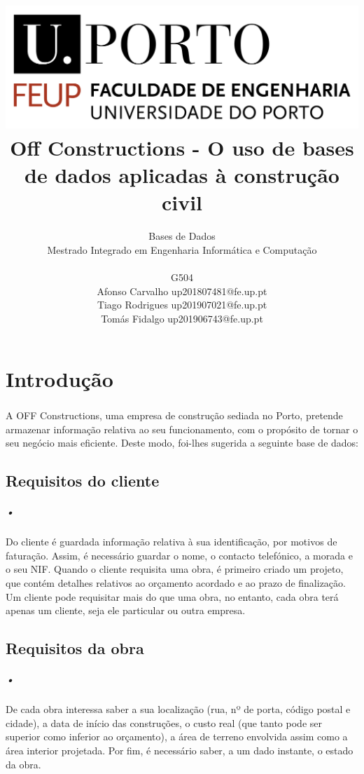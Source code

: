 \documentclass{report}
\title{ \includegraphics[scale=0.3]{logo.png} \\ \textbf{Off Constructions - O uso de bases de dados aplicadas à construção civil}}
\author{Bases de Dados \\ Mestrado Integrado em Engenharia Informática e Computação \\ \\ G504 \\ Afonso Carvalho up201807481@fe.up.pt \\ Tiago Rodrigues up201907021@fe.up.pt \\ Tomás Fidalgo up201906743@fe.up.pt}
\begin{document}
	\maketitle
	
	\tableofcontents
	
	\chapter{Introdução}
		\paragraph{}A OFF Constructions, uma empresa de construção sediada no Porto, pretende
		armazenar informação relativa ao seu funcionamento, com o propósito de tornar o seu
		negócio mais eficiente. Deste modo, foi-lhes sugerida a seguinte base de dados:
		
		\section{Requisitos do cliente}
		
			\paragraph{•}Do cliente é guardada informação relativa à sua identificação, por
			motivos de faturação. Assim, é necessário guardar o nome, o contacto telefónico, a
			morada e o seu NIF. Quando o cliente requisita uma obra, é primeiro criado um
			projeto, que contém detalhes relativos ao orçamento acordado e ao prazo de
			finalização. Um cliente pode requisitar mais do que uma obra, no entanto, cada
			obra terá apenas um cliente, seja ele particular ou outra empresa.
		
		\section{Requisitos da obra}
		
			\paragraph{•}De cada obra interessa saber a sua localização (rua, nº de porta,
			código postal e cidade), a data de início das construções, o custo real (que tanto
			pode ser superior como inferior ao orçamento), a área de terreno envolvida assim
			como a área interior projetada. Por fim, é necessário saber, a um dado instante, o
			estado da obra.
			
\end{document}
